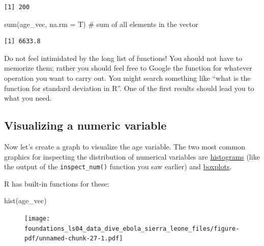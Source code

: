 \documentclass[
  letterpaper,
  DIV=11,
  numbers=noendperiod]{scrreprt}
\newenvironment{Shaded}{\begin{snugshade}}{\end{snugshade}}
\newcommand{\AttributeTok}[1]{\textcolor[rgb]{0.40,0.45,0.13}{#1}}
\newcommand{\CommentTok}[1]{\textcolor[rgb]{0.37,0.37,0.37}{#1}}
\newcommand{\FunctionTok}[1]{\textcolor[rgb]{0.28,0.35,0.67}{#1}}
\newcommand{\NormalTok}[1]{\textcolor[rgb]{0.00,0.23,0.31}{#1}}
\begin{document}
\begin{verbatim}
[1] 200
\end{verbatim}

\begin{Shaded}
\begin{Highlighting}[]
\FunctionTok{sum}\NormalTok{(age\_vec, }\AttributeTok{na.rm =}\NormalTok{ T) }\CommentTok{\# sum of all elements in the vector}
\end{Highlighting}
\end{Shaded}

\begin{verbatim}
[1] 6633.8
\end{verbatim}

Do not feel intimidated by the long list of functions! You should not
have to memorize them; rather you should feel free to Google the
function for whatever operation you want to carry out. You might search
something like ``what is the function for standard deviation in R''. One
of the first results should lead you to what you need.

\hypertarget{visualizing-a-numeric-variable}{%
\subsection{Visualizing a numeric
variable}\label{visualizing-a-numeric-variable}}

Now let's create a graph to visualize the age variable. The two most
common graphics for inspecting the distribution of numerical variables
are \href{https://www.mathsisfun.com/data/histograms.html}{histograms}
(like the output of the \texttt{inspect\_num()} function you saw
earlier) and
\href{https://www.mathsisfun.com/data/quartiles.html}{boxplots}.

R has built-in functions for these:

\begin{Shaded}
\begin{Highlighting}[]
\FunctionTok{hist}\NormalTok{(age\_vec)}
\end{Highlighting}
\end{Shaded}

\begin{figure}[H]

{\centering \texttt{[image: foundations\_ls04\_data\_dive\_ebola\_sierra\_leone\_files/figure-pdf/unnamed-chunk-27-1.pdf]}

}

\end{figure}
\end{document}

